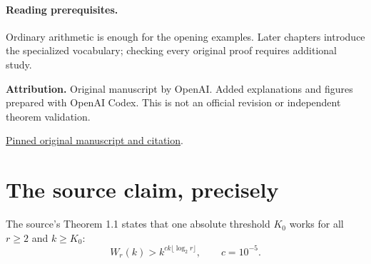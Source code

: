 \documentclass[11pt]{article}
\begin{document}
\paragraph{Reading prerequisites.} Ordinary arithmetic is enough for the opening examples. Later chapters introduce the specialized vocabulary; checking every original proof requires additional study.\par\textbf{Attribution.} Original manuscript by OpenAI. Added explanations and figures prepared with OpenAI Codex. This is not an official revision or independent theorem validation.\par\href{https://github.com/openai/math/tree/1581d4cbdd69a0faf34b2089614fe2a814316a6a/preprints/Quantitative-Superexponential-Bounds-for-van-der-Waerden-Numbers-September-23-2026}{Pinned original manuscript and citation}.\newpage\section*{The source claim, precisely}The source's Theorem 1.1 states that one absolute threshold $K_0$ works for all $r\ge2$ and $k\ge K_0$:
\[W_r(k)>k^{ck\lfloor\log_2r\rfloor},\qquad c=10^{-5}.\]
\end{document}
